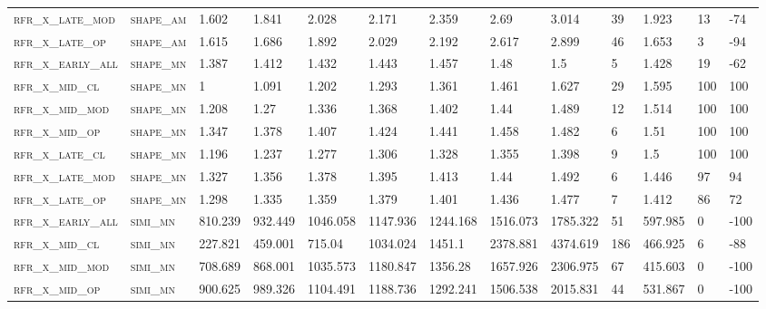\begin{landscape}
\begin{center}
\begin{footnotesize}
\begin{longtable}{lllllllllllll}
\textsc{rfr\_x\_late\_mod } & \textsc{shape\_am }   & 1.602   & 1.841   & 2.028    & 2.171    & 2.359    & 2.69     & 3.014    & 39   & 1.923   & 13  & -74   \\
\textsc{rfr\_x\_late\_op  } & \textsc{shape\_am }   & 1.615   & 1.686   & 1.892    & 2.029    & 2.192    & 2.617    & 2.899    & 46   & 1.653   & 3   & -94   \\
\textsc{rfr\_x\_early\_all} & \textsc{shape\_mn }   & 1.387   & 1.412   & 1.432    & 1.443    & 1.457    & 1.48     & 1.5      & 5    & 1.428   & 19  & -62   \\
\textsc{rfr\_x\_mid\_cl   } & \textsc{shape\_mn }   & 1       & 1.091   & 1.202    & 1.293    & 1.361    & 1.461    & 1.627    & 29   & 1.595   & 100 & 100   \\
\textsc{rfr\_x\_mid\_mod  } & \textsc{shape\_mn }   & 1.208   & 1.27    & 1.336    & 1.368    & 1.402    & 1.44     & 1.489    & 12   & 1.514   & 100 & 100   \\
\textsc{rfr\_x\_mid\_op   } & \textsc{shape\_mn }   & 1.347   & 1.378   & 1.407    & 1.424    & 1.441    & 1.458    & 1.482    & 6    & 1.51    & 100 & 100   \\
\textsc{rfr\_x\_late\_cl  } & \textsc{shape\_mn }   & 1.196   & 1.237   & 1.277    & 1.306    & 1.328    & 1.355    & 1.398    & 9    & 1.5     & 100 & 100   \\
\textsc{rfr\_x\_late\_mod } & \textsc{shape\_mn }   & 1.327   & 1.356   & 1.378    & 1.395    & 1.413    & 1.44     & 1.492    & 6    & 1.446   & 97  & 94    \\
\textsc{rfr\_x\_late\_op  } & \textsc{shape\_mn }   & 1.298   & 1.335   & 1.359    & 1.379    & 1.401    & 1.436    & 1.477    & 7    & 1.412   & 86  & 72    \\
\textsc{rfr\_x\_early\_all} & \textsc{simi\_mn  }   & 810.239 & 932.449 & 1046.058 & 1147.936 & 1244.168 & 1516.073 & 1785.322 & 51   & 597.985 & 0   & -100  \\
\textsc{rfr\_x\_mid\_cl   } & \textsc{simi\_mn  }   & 227.821 & 459.001 & 715.04   & 1034.024 & 1451.1   & 2378.881 & 4374.619 & 186  & 466.925 & 6   & -88   \\
\textsc{rfr\_x\_mid\_mod  } & \textsc{simi\_mn  }   & 708.689 & 868.001 & 1035.573 & 1180.847 & 1356.28  & 1657.926 & 2306.975 & 67   & 415.603 & 0   & -100  \\
\textsc{rfr\_x\_mid\_op   } & \textsc{simi\_mn  }   & 900.625 & 989.326 & 1104.491 & 1188.736 & 1292.241 & 1506.538 & 2015.831 & 44   & 531.867 & 0   & -100  \\

\end{longtable}
\end{footnotesize}
\end{center}
\end{landscape}
